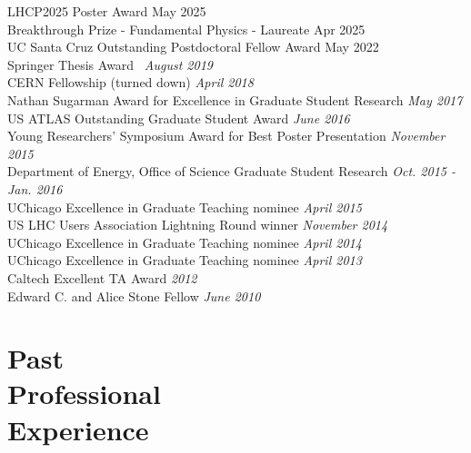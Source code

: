 \documentclass[margin,line]{resume}
\let\origsection\section%
\let\section\subsection%
\let\section\origsection%
\begin{document}
\begin{resume}
LHCP2025 Poster Award \hfill{May 2025}\\
Breakthrough Prize - Fundamental Physics - Laureate \hfill{Apr 2025}\\
UC Santa Cruz Outstanding Postdoctoral Fellow Award \hfill{May 2022}\\
Springer Thesis Award~\cite{Stark2020} \hfill \textsl{August 2019}\\
CERN Fellowship (turned down) \hfill \textsl{April 2018}\\
Nathan Sugarman Award for Excellence in Graduate Student Research \hfill \textsl{May 2017}\\
US ATLAS Outstanding Graduate Student Award \hfill \textsl{June 2016}\\
Young Researchers' Symposium Award for Best Poster Presentation \hfill \textsl{November 2015}\\
Department of Energy, Office of Science Graduate Student Research \hfill \textsl{Oct. 2015 - Jan. 2016}\\
UChicago Excellence in Graduate Teaching nominee \hfill \textsl{April 2015}\\
US LHC Users Association Lightning Round winner \hfill \textsl{November 2014}\\
UChicago Excellence in Graduate Teaching nominee \hfill \textsl{April 2014}\\
UChicago Excellence in Graduate Teaching nominee \hfill \textsl{April 2013}\\
Caltech Excellent TA Award \hfill \textsl{2012}\\
Edward C. and Alice Stone Fellow \hfill \textsl{June 2010}


\newpage

\section{\mysidestyle Past\\Professional\\Experience}


\end{resume}
\end{document}

